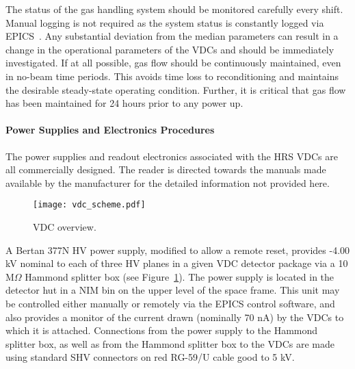 {The status of the gas handling system should be monitored carefully
every shift.  Manual logging is not required as the system status is
constantly logged via EPICS~\cite{EPICSwww}.  Any substantial deviation from the
median parameters can result in a change in the operational parameters
of the VDCs and should be immediately investigated.  If at all
possible, gas flow should be continuously maintained, even in
no-beam time periods.   This avoids time loss to reconditioning and
maintains the desirable steady-state operating condition.  Further,
it is critical that gas flow has been maintained for 24 hours prior
to any power up.

\paragraph{Power Supplies and Electronics Procedures}
\label{lv}

The power supplies and readout electronics associated with the HRS
VDCs are all commercially designed.  The reader is directed towards
the manuals made available by the manufacturer for the detailed
information not provided here.


\begin{figure}
\label{fig:vdcscheme}
\begin{center}
\texttt{[image: vdc\_scheme.pdf]}
\caption[Detectors: VDC Overview]{VDC overview.}
\end{center}
\end{figure}

A Bertan 377N HV power supply, modified to allow a remote reset,
provides -4.00 kV nominal to
each of three HV planes in a given VDC detector package via a
10 M$\Omega$ Hammond splitter box (see Figure~\ref{fig:vdcscheme}).
The power supply is located in
the detector hut in a NIM bin on the upper level of the space frame.
This unit may be controlled either manually or remotely via the
EPICS control software, and also provides a monitor of the
current drawn (nominally 70 nA) by the VDCs to which it is attached.
Connections from the power supply to the Hammond splitter box, as
well as from the Hammond splitter box to the VDCs are made using
standard SHV connectors on red RG-59/U cable good to 5 kV.

}
